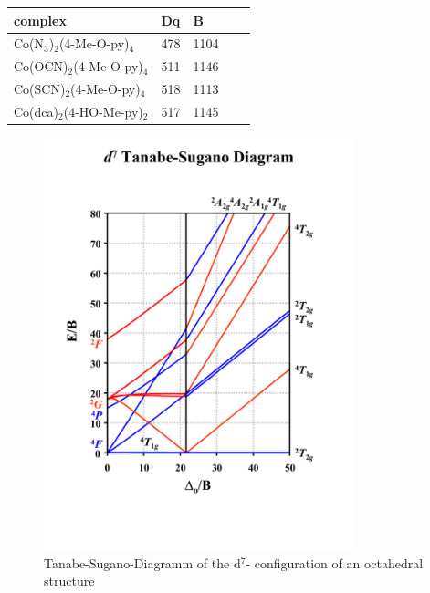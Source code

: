 \begin{table}[htpb!]
\centering
{}
\begin{tabular}{|l|l|l|l|l|}
\hline
complex &Dq & B\\
\hline
Co(N$_3$)$_2$(4-Me-O-py)$_4$ & 478 & 1104\\
\hline
Co(OCN)$_2$(4-Me-O-py)$_4$ &  511 & 1146\\
\hline
Co(SCN)$_2$(4-Me-O-py)$_4$ & 518 & 1113 \\
\hline
Co(dca)$_2$(4-HO-Me-py)$_2$ & 517  & 1145\\
\hline
\end{tabular}
\label{tab:Racah}
\end{table} 



 
\begin{figure}
\centering
\includegraphics[trim= 14mm 34mm 24mm 35mm, clip, width=0.8\textwidth]{figures/TSdiagram_06.pdf}
\caption[Tanabe-Sugano-Diagramm]{Tanabe-Sugano-Diagramm of the d$^7$- configuration of an octahedral structure \cite{tansug}}
\label{fig:TSD}
\end{figure}




